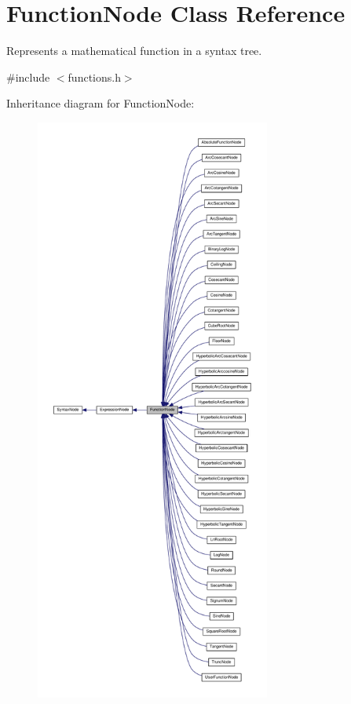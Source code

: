 \hypertarget{classFunctionNode}{}\section{Function\+Node Class Reference}
\label{classFunctionNode}


Represents a mathematical function in a syntax tree.  




{\ttfamily \#include $<$functions.\+h$>$}



Inheritance diagram for Function\+Node\+:\nopagebreak
\begin{figure}[H]
\begin{center}
\leavevmode
\includegraphics[height=550pt]{classFunctionNode__inherit__graph}
\end{center}
\end{figure}


